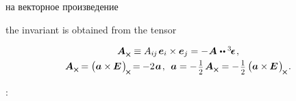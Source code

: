 {на векторное произведение

the invariant is obtained from the tensor


\nopagebreak\vspace{-0.15em}
\begin{equation}\label{pseudovectorinvariant}
\begin{array}{c}
\bm{A}_{\Xcompanion} \equiv A_{i\hspace{-0.1ex}j} \hspace{.25ex} \bm{e}_i \times \bm{e}_j = - \hspace{.1ex} \bm{A} \hspace{.1ex} \dotdotp \permutationsparitytensor
\hspace{.2ex}, \\[.3em]
%
\bm{A}_{\Xcompanion} \hspace{-0.16ex} = \left(^{\mathstrut} \hspace{-0.1ex} \bm{a} \times\hspace{-0.1ex} \UnitDyad \hspace{.2ex} \right)_{\hspace{-0.25ex}\Xcompanion} \hspace{-0.25ex} = \hspace{-0.12ex}
- 2 \hspace{.16ex} \bm{a} \hspace{.2ex},\:\:
\bm{a} = - \hspace{.2ex} \smalldisplaystyleonehalf \hspace{.25ex} \bm{A}_{\Xcompanion} = - \hspace{.2ex} \smalldisplaystyleonehalf \left(^{\mathstrut} \hspace{-0.1ex} \bm{a} \times\hspace{-0.1ex} \UnitDyad \hspace{.2ex} \right)_{\hspace{-0.25ex}\Xcompanion} \hspace{-0.2ex}.
\end{array}
\end{equation}

:

}
